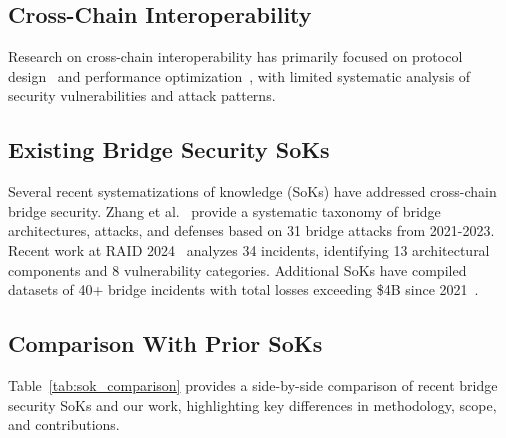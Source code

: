 \documentclass[runningheads]{llncs}
\begin{document}
\subsection{Cross-Chain Interoperability}
Research on cross-chain interoperability has primarily focused on protocol design~\cite{herlihy2018atomic} and performance optimization~\cite{zhang2021cross}, with limited systematic analysis of security vulnerabilities and attack patterns.

\subsection{Existing Bridge Security SoKs}
Several recent systematizations of knowledge (SoKs) have addressed cross-chain bridge security. Zhang et al.~\cite{zhang2023sok} provide a systematic taxonomy of bridge architectures, attacks, and defenses based on 31 bridge attacks from 2021-2023. Recent work at RAID 2024~\cite{raid2024sok} analyzes 34 incidents, identifying 13 architectural components and 8 vulnerability categories. Additional SoKs have compiled datasets of 40+ bridge incidents with total losses exceeding \$4B since 2021~\cite{recent2024sok}.

\subsection{Comparison With Prior SoKs}
Table~\ref{tab:sok_comparison} provides a side-by-side comparison of recent bridge security SoKs and our work, highlighting key differences in methodology, scope, and contributions.
\end{document}
